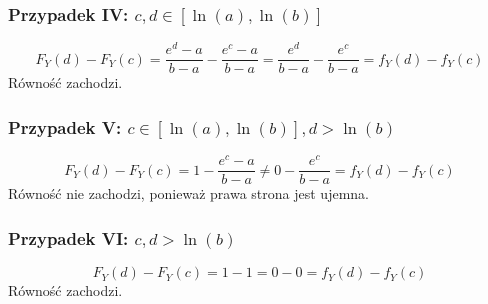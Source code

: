 \documentclass[polish, 8pt]{article}
\begin{document}
\subsubsection*{Przypadek IV: \( c,d \in [\ln(a), \ln(b)] \)}
\[
 F_Y(d) - F_Y(c) = \frac{e^d - a}{b-a} - \frac{e^c - a}{b-a} = \frac{e^d}{b-a} - \frac{e^c}{b-a} = f_Y(d) - f_Y(c)
\]
Równość zachodzi.

\subsubsection*{Przypadek V: \( c \in [\ln(a), \ln(b)], d > \ln(b) \)}
\[
 F_Y(d) - F_Y(c) = 1 - \frac{e^c - a}{b-a} \neq 0 - \frac{e^c}{b-a} = f_Y(d) - f_Y(c)
\]
Równość nie zachodzi, ponieważ prawa strona jest ujemna.

\subsubsection*{Przypadek VI: \( c, d > \ln(b) \)}
\[
 F_Y(d) - F_Y(c) = 1 - 1 = 0 - 0 = f_Y(d) - f_Y(c)
\]
Równość zachodzi.
\end{document}
